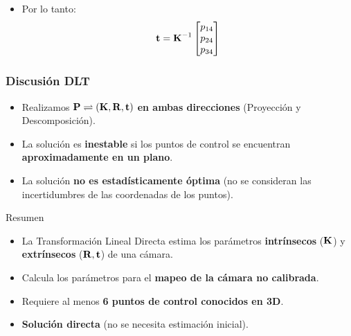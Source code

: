 \begin{frame}
\begin{itemize}
\begin{equation*}
\begin{bmatrix}
          t_x \\
          t_y \\
          t_z
      \end{bmatrix} = \intrinsicMatrix \translation
    \end{equation*}
    \item Por lo tanto:
    \begin{equation*}
      \boldsymbol{\mathbf{t}} = \boldsymbol{\mathbf{K}}^{-1}
      \begin{bmatrix}
          p_{14} \\
          p_{24} \\
          p_{34}
      \end{bmatrix}
    \end{equation*}
  \end{itemize}
\end{frame}

\begin{frame}
  \frametitle{Discusión DLT}
    \begin{itemize}
        \item Realizamos $\boldsymbol{\mathbf{P}} \rightleftharpoons (\boldsymbol{\mathbf{K}}, \boldsymbol{\mathbf{R}}, \boldsymbol{\mathbf{t}})$ \textbf{en ambas direcciones} (Proyección y Descomposición).
        \item La solución es \textbf{inestable} si los puntos de control se encuentran \textbf{aproximadamente en un plano}.
        \item La solución \textbf{no es estadísticamente óptima} (no se consideran las incertidumbres de las coordenadas de los puntos).
    \end{itemize}
\end{frame}

\begin{frame}{Resumen}
    \begin{itemize}
        \item La Transformación Lineal Directa estima los parámetros \textbf{intrínsecos} ($\boldsymbol{\mathbf{K}}$) y \textbf{extrínsecos} ($\boldsymbol{\mathbf{R}}, \boldsymbol{\mathbf{t}}$) de una cámara.
        \item Calcula los parámetros para el \textbf{mapeo de la cámara no calibrada}.
        \item Requiere al menos \textbf{6 puntos de control conocidos en 3D}.
        \item \textbf{Solución directa} (no se necesita estimación inicial).
    \end{itemize}
\end{frame}

